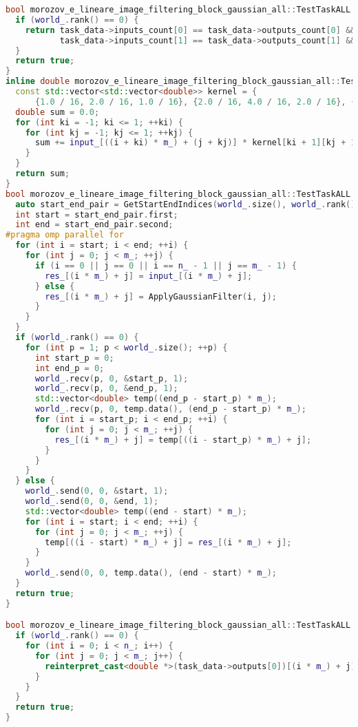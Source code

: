 \documentclass[a4paper,12pt]{article}
\begin{document}
\begin{lstlisting}[language=C++]
bool morozov_e_lineare_image_filtering_block_gaussian_all::TestTaskALL::ValidationImpl() {
  if (world_.rank() == 0) {
    return task_data->inputs_count[0] == task_data->outputs_count[0] && task_data->inputs_count[0] > 0 &&
           task_data->inputs_count[1] == task_data->outputs_count[1] && task_data->inputs_count[1] > 0;
  }
  return true;
}
inline double morozov_e_lineare_image_filtering_block_gaussian_all::TestTaskALL::ApplyGaussianFilter(int i, int j) {
  const std::vector<std::vector<double>> kernel = {
      {1.0 / 16, 2.0 / 16, 1.0 / 16}, {2.0 / 16, 4.0 / 16, 2.0 / 16}, {1.0 / 16, 2.0 / 16, 1.0 / 16}};
  double sum = 0.0;
  for (int ki = -1; ki <= 1; ++ki) {
    for (int kj = -1; kj <= 1; ++kj) {
      sum += input_[((i + ki) * m_) + (j + kj)] * kernel[ki + 1][kj + 1];
    }
  }
  return sum;
}
bool morozov_e_lineare_image_filtering_block_gaussian_all::TestTaskALL::RunImpl() {
  auto start_end_pair = GetStartEndIndices(world_.size(), world_.rank(), n_);
  int start = start_end_pair.first;
  int end = start_end_pair.second;
#pragma omp parallel for
  for (int i = start; i < end; ++i) {
    for (int j = 0; j < m_; ++j) {
      if (i == 0 || j == 0 || i == n_ - 1 || j == m_ - 1) {
        res_[(i * m_) + j] = input_[(i * m_) + j];
      } else {
        res_[(i * m_) + j] = ApplyGaussianFilter(i, j);
      }
    }
  }
  if (world_.rank() == 0) {
    for (int p = 1; p < world_.size(); ++p) {
      int start_p = 0;
      int end_p = 0;
      world_.recv(p, 0, &start_p, 1);
      world_.recv(p, 0, &end_p, 1);
      std::vector<double> temp((end_p - start_p) * m_);
      world_.recv(p, 0, temp.data(), (end_p - start_p) * m_);
      for (int i = start_p; i < end_p; ++i) {
        for (int j = 0; j < m_; ++j) {
          res_[(i * m_) + j] = temp[((i - start_p) * m_) + j];
        }
      }
    }
  } else {
    world_.send(0, 0, &start, 1);
    world_.send(0, 0, &end, 1);
    std::vector<double> temp((end - start) * m_);
    for (int i = start; i < end; ++i) {
      for (int j = 0; j < m_; ++j) {
        temp[((i - start) * m_) + j] = res_[(i * m_) + j];
      }
    }
    world_.send(0, 0, temp.data(), (end - start) * m_);
  }
  return true;
}

bool morozov_e_lineare_image_filtering_block_gaussian_all::TestTaskALL::PostProcessingImpl() {
  if (world_.rank() == 0) {
    for (int i = 0; i < n_; i++) {
      for (int j = 0; j < m_; j++) {
        reinterpret_cast<double *>(task_data->outputs[0])[(i * m_) + j] = res_[(i * m_) + j];
      }
    }
  }
  return true;
}

\end{lstlisting}
\end{document}
